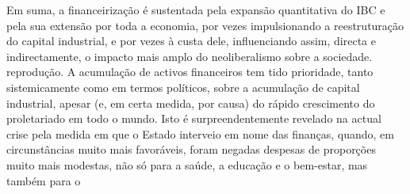  \par 
Em suma, a financeirização é sustentada pela expansão quantitativa do IBC e pela sua extensão por toda a economia, por vezes impulsionando a reestruturação do capital industrial, e por vezes à custa dele, influenciando assim, directa e indirectamente, o impacto mais amplo do neoliberalismo sobre a sociedade. reprodução. A acumulação de activos financeiros tem tido prioridade, tanto sistemicamente como em termos políticos, sobre a acumulação de capital industrial, apesar (e, em certa medida, por causa) do rápido crescimento do proletariado em todo o mundo. Isto é surpreendentemente revelado na actual crise pela medida em que o Estado interveio em nome das finanças, quando, em circunstâncias muito mais favoráveis, foram negadas despesas de proporções muito mais modestas, não só para a saúde, a educação e o bem-estar, mas também para o
 \par 
